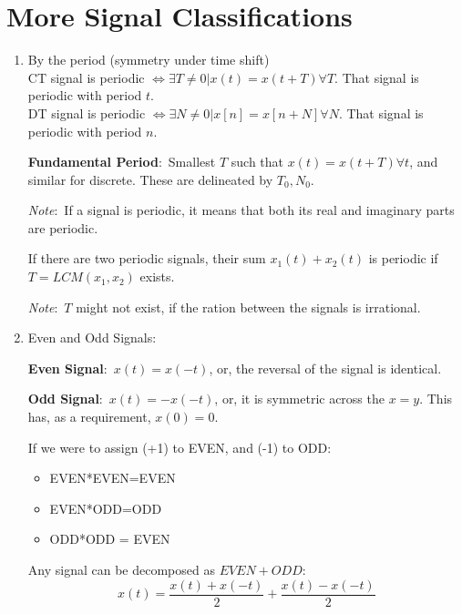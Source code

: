 \documentclass[nobib]{tufte-handout}
\newcommand{\defn}[2]{
        \begin{defbox}
        \noindent\textbf{#1}:\ #2
        \end{defbox}
}
\newcommand{\note}[1]{
        \begin{notebox}
        \noindent\textit{Note}:\ #1
        \end{notebox}
}
\begin{document}
\section{More Signal Classifications}
\begin{enumerate}[start = 3]
    \item By the period (symmetry under time shift)\\
    CT signal is periodic $\iff \exists T\neq 0 | x(t)=x(t+T) \forall T$. That signal is periodic with period $t$.\\
    DT signal is periodic $\iff \exists N\neq 0 | x[n]=x[n+N] \forall N$. That signal is periodic with period $n$.
    \defn{Fundamental Period}{Smallest $T$ such that $x(t)=x(t+T)\forall t$, and similar for discrete. These are delineated by $T_0,N_0$.}
    \note{If a signal is periodic, it means that both its real and imaginary parts are periodic.}
    If there are two periodic signals, their sum $x_1(t)+x_2(t)$ is periodic if $T = LCM(x_1,x_2)$ exists.
    \note{$T$ might not exist, if the ration between the signals is irrational.}
    \item Even and Odd Signals:
    \defn{Even Signal}{$x(t) = x(-t)$, or, the reversal of the signal is identical.}
    \defn{Odd Signal}{$x(t) = -x(-t)$, or, it is symmetric across the $x=y$. This has, as a requirement, $x(0) = 0$.}
    If we were to assign (+1) to EVEN, and (-1) to ODD:
    \begin{itemize}
        \item EVEN*EVEN=EVEN
        \item EVEN*ODD=ODD
        \item ODD*ODD = EVEN
    \end{itemize}
    Any signal can be decomposed as $EVEN+ODD$:
    \begin{equation*}
        x(t) = \frac{x(t)+x(-t)}{2}+\frac{x(t)-x(-t)}{2}
    \end{equation*}
\end{enumerate}
\end{document}
